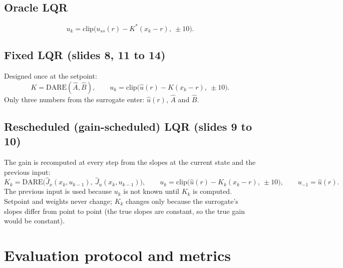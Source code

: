 \documentclass[11pt]{article}
\begin{document}
\subsection{Oracle LQR}
\begin{equation}
u_k = \mathrm{clip}\big(u_{ss}(r) - K^*(x_k-r),\ \pm10\big).
\end{equation}

\subsection{Fixed LQR (slides 8, 11 to 14)}
Designed once at the setpoint:
\begin{equation}
K = \mathrm{DARE}(\hat A,\hat B),\qquad u_k = \mathrm{clip}\big(\hat u(r) - K(x_k-r),\ \pm10\big).
\end{equation}
Only three numbers from the surrogate enter: $\hat u(r)$, $\hat A$ and $\hat B$.

\subsection{Rescheduled (gain-scheduled) LQR (slides 9 to 10)}
The gain is recomputed at every step from the slopes at the current state and the previous input:
\begin{equation}
K_k = \mathrm{DARE}\big(\hat J_x(x_k,u_{k-1}),\ \hat J_u(x_k,u_{k-1})\big),\qquad u_k = \mathrm{clip}\big(\hat u(r) - K_k(x_k-r),\ \pm10\big),\qquad u_{-1}=\hat u(r).
\end{equation}
The previous input is used because $u_k$ is not known until $K_k$ is computed. Setpoint and weights never change; $K_k$ changes only because the surrogate's slopes differ from point to point (the true slopes are constant, so the true gain would be constant).

\section{Evaluation protocol and metrics}\label{sec:eval}
\end{document}
